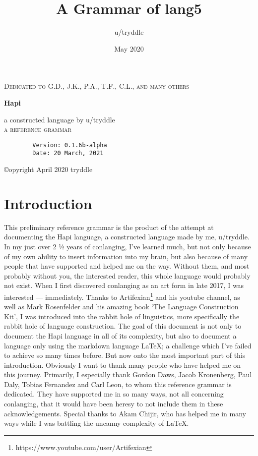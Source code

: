 \documentclass[a4paper, 12pt, oneside]{memoir}
\title{A Grammar of lang5}
\author{u/tryddle}
\date{May 2020}
\makeatletter
\newlength\drop
\newcommand*\titleM{\begingroup%
\setlength\drop{0.08\textheight}
\centering
{\scshape Dedicated to G.D., J.K., P.A., T.F., C.L., and many others\par}
\vspace*{\drop}
   
\vspace*{\drop}
\begin{flushleft}
{\HUGE\bfseries Hapi}\\
\end{flushleft}
\vspace*{\drop}
\vspace*{\drop}
\begin{flushright}
{\LARGE a constructed language by u/tryddle}\\[\baselineskip]
{\scshape a reference grammar}\\[\baselineskip]
{\scshape \@date}\par
\end{flushright}


\endgroup}
\makeatother
\begin{document}
\begin{titlingpage}
\titleM{}
\end{titlingpage}
\pagebreak
{}

\vspace*{\fill}

\begin{center}
    \begin{verbatim}
        Version: 0.1.6b-alpha
        Date: 20 March, 2021
    \end{verbatim}
    ©opyright April 2020 tryddle
\end{center}

\vspace*{\fill}

\restoregeometry

\pagebreak
\setcounter{tocdepth}{4}
\tableofcontents
\newpage 
\listoffigures
\listoftables
\newpage
\printglossaries
\newpage

\chapter{Introduction}
This preliminary reference grammar is the product of the attempt at documenting the Hapi language, a constructed language made by me, u/tryddle. In my just over 2 ½ years of conlanging, I've learned much, but not only because of my own ability to insert information into my brain, but also because of many people that have supported and helped me on the way. Without them, and most probably without you, the interested reader, this whole language would probably not exist. When I first discovered conlanging as an art form in late 2017, I was interested — immediately. Thanks to Artifexian\footnote{https://www.youtube.com/user/Artifexian} and his youtube channel, as well as Mark Rosenfelder and his amazing book `The Language Construction Kit', I was introduced into the rabbit hole of linguistics, more specifically the rabbit hole of language construction. 
The goal of this document is not only to document the Hapi language in all of its complexity, but also to document a language only using the markdown language \LaTeX; a challenge which I've failed to achieve so many times before. 
But now onto the most important part of this introduction. Obviously I want to thank many people who have helped me on this journey. Primarily, I especially thank Gordon Daws, Jacob Kronenberg, Paul Daly, Tobias Fernandez and Carl Leon, to whom this reference grammar is dedicated. They have supported me in so many ways, not all concerning conlanging, that it would have been heresy to not include them in these acknowledgements. Special thanks to Akam Chijir, who has helped me in many ways while I was battling the uncanny complexity of \LaTeX.
\end{document}
